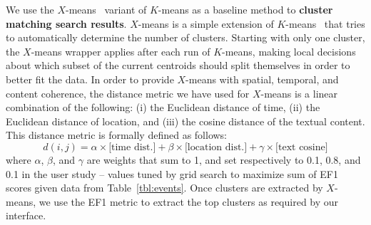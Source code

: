  
 We use the $X$-means~\cite{Pelleg2000} variant of $K$-means as a baseline method to {\bf cluster matching search results}. $X$-means is a simple extension of $K$-means~\cite{kmeans_original} that tries to  automatically determine the number of clusters. Starting with only one cluster, the $X$-means wrapper applies after each run of $K$-means, making local decisions about which subset of the current centroids should split themselves in order to better fit the data.  In order to provide $X$-means with spatial, temporal, and content coherence, the distance metric we have used for $X$-means is a linear combination of the following: (i) the Euclidean distance of time, (ii) the Euclidean distance of location, and (iii) the cosine distance of the textual content. This distance metric is formally defined as follows:
\begin{equation}
d(i,j)=  \alpha\times\textrm{[time dist.]} +
 \beta\times\textrm{[location dist.]}+
  \gamma\times\textrm{[text cosine]}
\end{equation}
where $\alpha$, $\beta$, and $\gamma$ are weights that sum to 1, %
and set respectively to 0.1, 0.8, and 0.1 in the user study -- values tuned by grid search to maximize sum of EF1 scores given data from Table~\ref{tbl:events}.  Once clusters are extracted by $X$-means, we use the EF1 metric to extract the top clusters as required by our interface.











